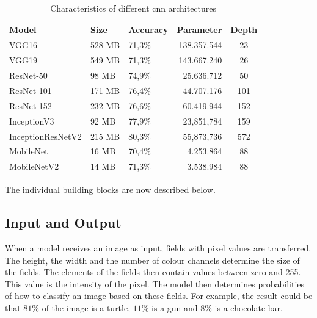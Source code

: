 { \begin{table}
   \begin{tabular}{lllrc}
     Model             & Size   & Accuracy    & Parameter   & Depth \\ \hline
     VGG16             & 528 MB & 71{,}3\%    & 138.357.544 & 23 \\     
     VGG19             & 549 MB & 71{,}3\%    & 143.667.240 & 26 \\     
     ResNet-50         &  98 MB & 74{,}9\%    &  25.636.712 & 50 \\     
     ResNet-101        & 171 MB & 76{,}4\%    &  44.707.176 & 101 \\     
     ResNet-152        & 232 MB & 76{,}6\%    &  60.419.944 & 152 \\     
     InceptionV3       &  92 MB & 77{,}9\%    &  23,851,784 & 159 \\
     InceptionResNetV2 & 215 MB & 80{,}3\%    &  55,873,736 & 572 \\
     MobileNet         &  16 MB & 70,{4}\%    &   4.253.864 & 88 \\       
     MobileNetV2       &  14 MB & 71,{3}\%    &   3.538.984 & 88 \\       
    \end{tabular}
  \caption{Characteristics of different \ac{cnn} architectures}\label{concept:Parameter}
 \end{table}
 
The individual building blocks are now described below.



\subsection{Input and Output}

When a model receives an image as input, fields with pixel values are transferred. The height, the width and the number of colour channels determine the size of the fields. The elements of the fields then contain values between zero and 255. This value is the intensity of the pixel. The model then determines probabilities of how to classify an image based on these fields. For example, the result could be that $81\%$ of the image is a turtle, $11\%$ is a gun and $8\%$ is a chocolate bar.


}
